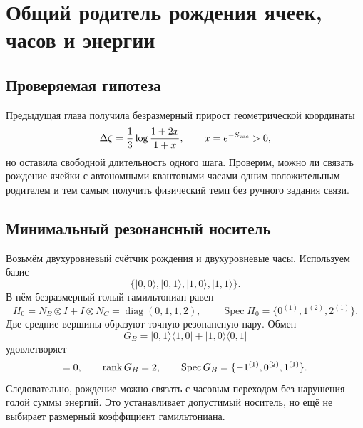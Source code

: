 \chapter{Общий родитель рождения ячеек, часов и энергии}
\label{ch:v10-cell-birth-clock-energy-common-parent-origin}

\section{Проверяемая гипотеза}

Предыдущая глава получила безразмерный прирост геометрической координаты
\begin{equation}
 \Delta\zeta=\frac13\log\frac{1+2x}{1+x},
 \qquad x=e^{-S_{\rm vac}}>0,
 \label{eq:v10-clock-delta-zeta}
\end{equation}
но оставила свободной длительность одного шага. Проверим, можно ли связать
рождение ячейки с автономными квантовыми часами одним положительным
родителем и тем самым получить физический темп без ручного задания связи.

\section{Минимальный резонансный носитель}

Возьмём двухуровневый счётчик рождения и двухуровневые часы. Используем
базис
\begin{equation}
 \{|0,0\rangle,|0,1\rangle,|1,0\rangle,|1,1\rangle\}.
\end{equation}
В нём безразмерный голый гамильтониан равен
\begin{equation}
 H_0=N_B\otimes I+I\otimes N_C
 =\operatorname{diag}(0,1,1,2),
 \qquad \operatorname{Spec}H_0=\{0^{(1)},1^{(2)},2^{(1)}\}.
 \label{eq:v10-clock-bare-hamiltonian}
\end{equation}
Две средние вершины образуют точную резонансную пару. Обмен
\begin{equation}
 G_B=|0,1\rangle\langle1,0|+|1,0\rangle\langle0,1|
 \label{eq:v10-clock-exchange}
\end{equation}
удовлетворяет
\begin{equation}
 [H_0,G_B]=0,
 \qquad \rank G_B=2,
 \qquad \operatorname{Spec}G_B=\{-1^{(1)},0^{(2)},1^{(1)}\}.
 \label{eq:v10-clock-exchange-data}
\end{equation}
Следовательно, рождение можно связать с часовым переходом без нарушения
голой суммы энергий. Это устанавливает допустимый носитель, но ещё не
выбирает размерный коэффициент гамильтониана.


